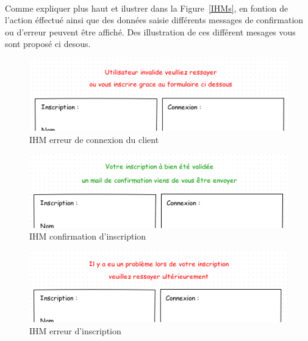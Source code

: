 \documentclass[a4paper,11pt]{article}
\begin{document}
\paragraph{}
Comme expliquer plus haut et ilustrer dans la Figure~\ref{IHMs}, en fontion de l'action éffectué ainsi que des données saisie différents messages de confirmation ou d'erreur peuvent être affiché. Des illustration de ces différent mesages vous sont proposé ci desous.

\begin{figure}[H]
  \begin{center}
    \includegraphics[width=15cm]{../../IHM/IHM_connection_utilisateur_erreur_co_z.png}
    \caption{IHM erreur de connexion du client}
  \end{center}
\end{figure}

\begin{figure}[H]
  \begin{center}
    \includegraphics[width=15cm]{../../IHM/IHM_connection_utilisateur_conf_ins_z.png}
    \caption{IHM confirmation d'inscription}
  \end{center}
\end{figure}

\begin{figure}[H]
  \begin{center}
    \includegraphics[width=15cm]{../../IHM/IHM_connection_utilisateur_erreur_ins_z.png}
    \caption{IHM erreur d'inscription}
  \end{center}
\end{figure}
\end{document}
